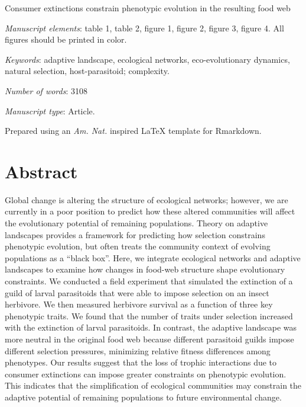 \documentclass[11pt,]{article}
\title{}
\author{}
\date{}
\begin{document}
\vspace*{0.1cm}

\begin{center} \LARGE Consumer extinctions constrain phenotypic evolution in the resulting food web \end{center}

\bigskip

\emph{Manuscript elements}: table 1, table 2, figure 1, figure 2, figure
3, figure 4. All figures should be printed in color.

\bigskip

\emph{Keywords}: adaptive landscape, ecological networks,
eco-evolutionary dynamics, natural selection, host-parasitoid;
complexity.

\bigskip

\emph{Number of words}: 3108

\bigskip

\emph{Manuscript type}: Article.

\bigskip

\footnotesize Prepared using an \emph{Am. Nat.} inspired \LaTeX{}
template for Rmarkdown. \normalsize

\linenumbers{} \modulolinenumbers[3]

\newpage

\section{Abstract}\label{abstract}

Global change is altering the structure of ecological networks; however,
we are currently in a poor position to predict how these altered
communities will affect the evolutionary potential of remaining
populations. Theory on adaptive landscapes provides a framework for
predicting how selection constrains phenotypic evolution, but often
treats the community context of evolving populations as a ``black box''.
Here, we integrate ecological networks and adaptive landscapes to
examine how changes in food-web structure shape evolutionary
constraints. We conducted a field experiment that simulated the
extinction of a guild of larval parasitoids that were able to impose
selection on an insect herbivore. We then measured herbivore survival as
a function of three key phenotypic traits. We found that the number of
traits under selection increased with the extinction of larval
parasitoids. In contrast, the adaptive landscape was more neutral in the
original food web because different parasitoid guilds impose different
selection pressures, minimizing relative fitness differences among
phenotypes. Our results suggest that the loss of trophic interactions
due to consumer extinctions can impose greater constraints on phenotypic
evolution. This indicates that the simplification of ecological
communities may constrain the adaptive potential of remaining
populations to future environmental change.
\end{document}
